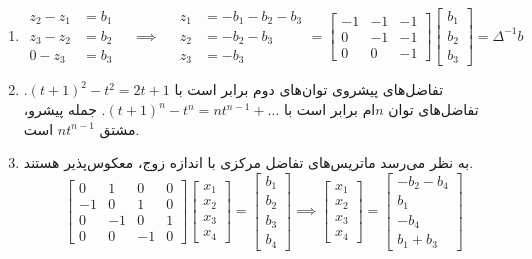 \documentclass[12pt,a4paper]{article}
\begin{document}
{\begin{enumerate}
			\item
			\[
			\begin{aligned}
				z_2 - z_1 &= b_1 \\
				z_3 - z_2 &= b_2 \\
				0 - z_3 &= b_3
			\end{aligned}
			\quad \implies \quad
			\begin{aligned}
				z_1 &= -b_1-b_2-b_3 \\
				z_2 &= -b_2-b_3 \\
				z_3 &= -b_3
			\end{aligned}
			=
			\begin{bmatrix} -1 & -1 & -1 \\ 0 & -1 & -1 \\ 0 & 0 & -1 \end{bmatrix}
			\begin{bmatrix} b_1 \\ b_2 \\ b_3 \end{bmatrix} = \Delta^{-1}b
			\]
			
			\item تفاضل‌های پیشروی توان‌های دوم برابر است با $(t+1)^2 - t^2 = 2t+1$. تفاضل‌های توان $n$ام برابر است با $(t+1)^n - t^n = nt^{n-1} + \dots$. جمله پیشرو، مشتق $nt^{n-1}$ است.
			
			\item به نظر می‌رسد ماتریس‌های تفاضل مرکزی با اندازه زوج، معکوس‌پذیر هستند.
			\[
			\begin{bmatrix} 0 & 1 & 0 & 0 \\ -1 & 0 & 1 & 0 \\ 0 & -1 & 0 & 1 \\ 0 & 0 & -1 & 0 \end{bmatrix}
			\begin{bmatrix} x_1 \\ x_2 \\ x_3 \\ x_4 \end{bmatrix} =
			\begin{bmatrix} b_1 \\ b_2 \\ b_3 \\ b_4 \end{bmatrix}
			\implies
			\begin{bmatrix} x_1 \\ x_2 \\ x_3 \\ x_4 \end{bmatrix} =
			\begin{bmatrix} -b_2-b_4 \\ b_1 \\ -b_4 \\ b_1+b_3 \end{bmatrix}
			\]
			

\end{enumerate}}
\end{document}
